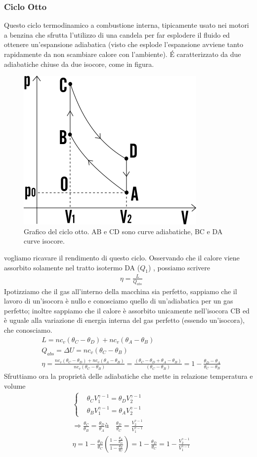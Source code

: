 \documentclass[10pt,a4paper]{article}
\begin{document}
\subsubsection{Ciclo Otto}
Questo ciclo termodinamico a combustione interna, tipicamente usato nei motori a benzina che sfrutta l'utilizzo di una candela per far esplodere il fluido ed ottenere un'espansione adiabatica (visto che esplode l'espansione avviene tanto rapidamente da non scambiare calore con l'ambiente). \'{E} caratterizzato da due adiabatiche chiuse da due isocore, come in figura.
\begin{figure}[h!]
	\centering
	\includegraphics[width=0.4\linewidth]{../images/ciclo-otto}
	\caption{Grafico del ciclo otto. AB e CD sono curve adiabatiche, BC e DA curve isocore.}
	\label{fig:ciclo-otto}
\end{figure}
\FloatBarrier
vogliamo ricavare il rendimento di questo ciclo. Osservando che il calore viene assorbito solamente nel tratto isotermo DA ($Q_1$) , possiamo scrivere
\begin{align*}
 &\eta = \frac{L}{Q_{abs}}
\end{align*} 
Ipotizziamo che il gas all'interno della macchina sia perfetto, sappiamo che il lavoro di un'isocora è nullo e conosciamo quello di un'adiabatica per un gas perfetto; inoltre sappiamo che il calore è assorbito unicamente nell'isocora CB ed è uguale alla variazione di energia interna del gas perfetto (essendo un'isocora), che conosciamo.
\begin{align*}
	&L =n c_v (\theta_C-\theta_D) + n c_v(\theta_A-\theta_B)\\
	&Q_{abs} = \Delta U = n c_v (\theta_C-\theta_B)\\
	&\eta = \frac{n c_v (\theta_C-\theta_D) + n c_v(\theta_A-\theta_B)}{n c_v (\theta_C-\theta_B)} = \frac{(\theta_C-\theta_D + \theta_A-\theta_B)}{(\theta_C-\theta_B)} = 1 - \frac{\theta_D - \theta_A}{\theta_C - \theta_B}
\end{align*}
 Sfruttiamo ora la proprietà delle adiabatiche che mette in relazione temperatura e volume
 \begin{align*}
 &\begin{cases}
 	&\theta_C V_1^{\gamma-1} = \theta_D V_2^{\gamma-1}\\
 	&\theta_B V_1^{\gamma-1} = \theta_A V_2^{\gamma-1}
 \end{cases}\\
& \Rightarrow \frac{\theta_C}{\theta_B} = \frac{\theta_D}{\theta_A}ù \quad \frac{\theta_D}{\theta_C}=\frac{V_2^{\gamma-1}}{V_1^{\gamma-1}}\\
&\eta = 1 - \frac{\theta_D}{\theta_C}\left(\frac{1-\frac{\theta_A}{\theta_D}}{1-\frac{\theta_B}{\theta_C}}\right) = 1-\frac{\theta_D}{\theta_C} = 1-\frac{V_2^{\gamma-1}}{V_1^{\gamma-1}}
\end{align*}
\end{document}
